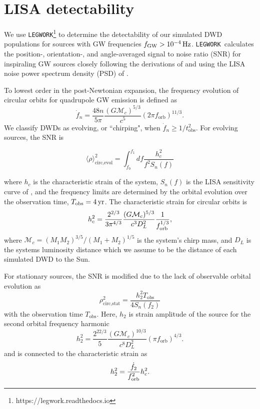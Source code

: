 \documentclass[twocolumn]{aastex631}
\newcommand{\legwork}{\texttt{LEGWORK}}
\begin{document}
\section{LISA detectability}
\label{sec:LISA_obs}
We use \legwork\footnote{https://legwork.readthedocs.io} \citep{Wagg2021} to determine the detectability of our simulated DWD populations for sources with GW frequencies $f_{\rm{GW}}>10^{-4}\,\rm{Hz}$. \legwork\ calculates the position-, orientation-, and angle-averaged signal to noise ratio (SNR) for inspiraling GW sources closely following the derivations of \citet{Flanagan1998} and using the LISA noise power spectrum density (PSD) of \citet{Robson2019}. 

To lowest order in the post-Newtonian expansion, the frequency evolution of circular orbits for quadrupole GW emission is defined as
\begin{equation}
    \Dot{f}_n = \frac{48n}{5\pi} \frac{(G\mathcal{M}_c)^{5/3}}{c^5} (2\pi f_\text{orb})^{11/3}.
\end{equation}
We classify DWDs as evolving, or ``chirping", when $\Dot{f}_n \geq 1/t_\text{obs}^2$. For evolving sources, the SNR is

\begin{equation}
   \langle \rho \rangle^2_{\text{circ,evol}} = \int_{f_0}^{f_1}df   \frac{h_{c}^2}{f^2S_n(f)}
\end{equation}

\noindent where $h_c$ is the characteristic strain of the system, $S_n(f)$ is the LISA sensitivity curve of \citet{Robson2019}, and the frequency limits are determined by the orbital evolution over the observation time, $T_{\rm{obs}}=4\,\rm{yr}$. The characteristic strain for %
circular orbits is 
\begin{equation}
    h_{c}^2 = \frac{2^{2/3}}{3 \pi^{4/3}} \frac{(G \mathcal{M}_c)^{5/3}}{c^3 D_L^2} \frac{1}{f_{\rm orb}^{1/3}},
\end{equation}
\noindent where $\mathcal{M}_c = (M_1M_2)^{3/5}/(M_1 + M_2)^{1/5}$ is the system's chirp mass, and $D_L$ is the systems luminosity distance which we assume to be the distance of each simulated DWD to the Sun. 

For stationary sources, the SNR is modified due to the lack of observable orbital evolution as
\begin{equation}
    \rho_{\text{circ,stat}}^2 = \frac{h_{2}^2T_{\text{obs}}}{4 S_n(f_2)}
\end{equation}
with the observation time $T_{\text{obs}}$. Here, $h_2$ is strain amplitude of the source for the second orbital frequency harmonic
\begin{equation}
   h_2^2 = \frac{2^{22/3}}{5}\frac{(G\mathcal{M}_c)^{10/3}}{c^8D_L^2}(\pi f_\text{orb})^{4/3}.
\end{equation}
and is connected to the characteristic strain as
\begin{equation}
    h_2^2 = \frac{\dot{f}_{2}}{f_{\rm{orb}}^2} h_c^2.
\end{equation}
\end{document}
